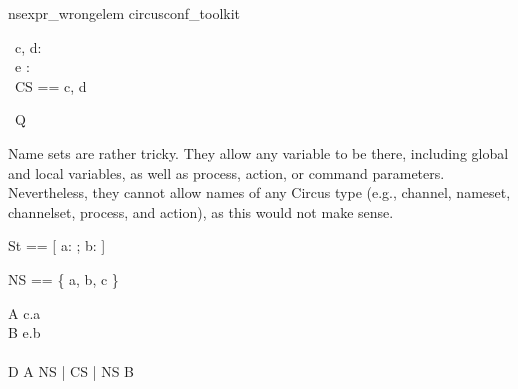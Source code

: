 \begin{zsection}
   \SECTION nsexpr\_wrongelem \parents circusconf\_toolkit
\end{zsection}

\begin{circus}
   \circchannel\ c, d: \nat \\
   \circchannel\ e : \nat \cross \nat \\
   \circchannelset\ CS == \lchanset c, d \rchanset
\end{circus}

\begin{circus}
   \circprocess\ Q \circdef \circbegin
\end{circus}

Name sets are rather tricky. They allow any variable to be there,
including global and local variables, as well as process, action,
or command parameters. Nevertheless, they cannot allow names of
any Circus type (e.g., channel, nameset, channelset, process, 
and action), as this would not make sense. 
\begin{circusaction}
    \circstate St == [ a: \nat; b: \nat \cross \nat ]
\end{circusaction}

\begin{circusaction}
   \circnameset NS == \{ a, b, c \}
\end{circusaction}

\begin{circusaction}
    A \circdef c.a \then \Skip
    \\
    B \circdef e.b \then \Skip
    \\
    \\
    D \circdef A \lpar NS | CS | NS \rpar B
    \\    
\end{circusaction}

\begin{circusaction}
    \circspot \Skip
\end{circusaction}

\begin{circus}
   \circend
\end{circus}


